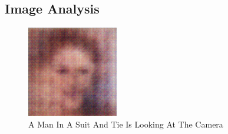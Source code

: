 \documentclass{article}%
\begin{document}
%
\subsection{Image Analysis}%
\label{subsec:ImageAnalysis}%


\begin{figure}[h!]%
\centering%
\includegraphics[width=150px]{500_fake_images/samples_5_438.png}%
\caption{A Man In A Suit And Tie Is Looking At The Camera}%
\end{figure}

%
\end{document}
